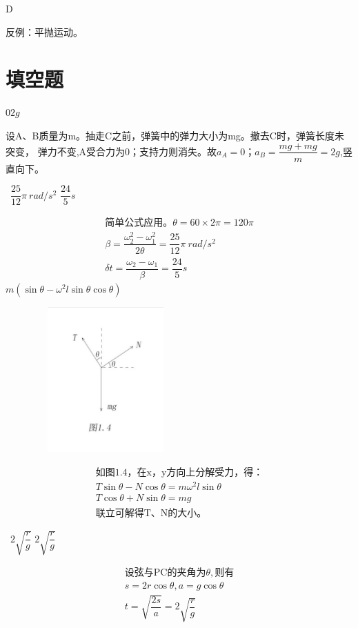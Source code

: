 \documentclass[b5paper,opensource]{qyxf-book}
\begin{document}
D

\solve 反例：平抛运动。

\section{填空题}
$0$\qquad$2g$

\solve 设A、B质量为m。抽走C之前，弹簧中的弹力大小为mg。撤去C时，弹簧长度未突变，
弹力不变,A受合力为0；支持力则消失。故$a_A=0；a_B=\dfrac{mg+mg}{m}=2g$,竖直向下。

\ $\dfrac{25}{12}\pi\ rad/s^2$ \qquad$\dfrac{24}{5}s$

\begin{gather*}
\text{简单公式应用。}\theta=60\times2\pi=120\pi\\
\beta=\dfrac{\omega_2^2-\omega_1^2}{2\theta}=\dfrac{25}{12}\pi\ rad/s^2\\
\delta t=\dfrac{\omega_2-\omega_1}{\beta}=\dfrac{24}{5}s
\end{gather*}
$m(\sin\theta-\omega^2l\sin\theta\cos\theta)$

\begin{figure}[htbp]
	\centering
	\includegraphics[width=15em, height=15em]{Chp1_illus4.png}
	\label{fig:c1}
\end{figure}

\begin{gather*}
\text{如图1.4，在x，y方向上分解受力，得：}\\		
T\sin\theta-N\cos\theta=m\omega^2l\sin\theta\\
T\cos\theta+N\sin\theta=mg\\
\text{联立可解得T、N的大小。}
\end{gather*}

\ $2\sqrt{\dfrac{r}{g}}$ \qquad $2\sqrt{\dfrac{r}{g}}$

\begin{gather*}
\text{设弦与PC的夹角为}\theta,\text{则有}\\
s=2r\cos\theta,a=g\cos\theta\\
t=\sqrt{\dfrac{2s}{a}}=2\sqrt{\dfrac{r}{g}}
\end{gather*}
\end{document}
